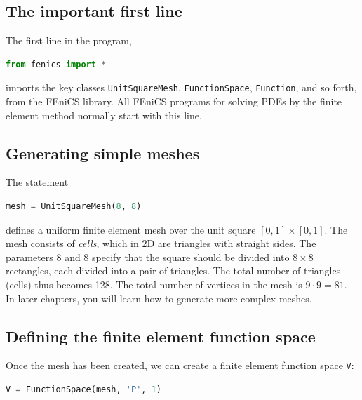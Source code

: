 \documentclass[graybox,envcountchap,sectrefs,final]{svmonodo}
\begin{document}
\subsection{The important first line}

The first line in the program,

\begin{lstlisting}[language=Python,style=graycolor]
from fenics import *
\end{lstlisting}
imports the key classes \texttt{UnitSquareMesh}, \texttt{FunctionSpace}, \texttt{Function},
and so forth, from the FEniCS library.  All FEniCS programs for
solving PDEs by the finite element method normally start with this
line.



\subsection{Generating simple meshes}

The statement

\begin{lstlisting}[language=Python,style=graycolor]
mesh = UnitSquareMesh(8, 8)
\end{lstlisting}
defines a uniform finite element mesh over the unit square
$[0,1]\times [0,1]$. The mesh consists of \emph{cells}, which in 2D are triangles
with straight sides. The parameters 8 and 8 specify that the square
should be divided into $8\times 8$ rectangles, each divided into a pair of
triangles. The total number of triangles (cells) thus becomes
128. The total number of vertices in the mesh is $9\cdot 9=81$.
In later chapters, you will learn how to generate more complex meshes.


\subsection{Defining the finite element function space}


Once the mesh has been created, we can create a finite element
function space \texttt{V}:

\begin{lstlisting}[language=Python,style=graycolor]
V = FunctionSpace(mesh, 'P', 1)
\end{lstlisting}
\end{document}
